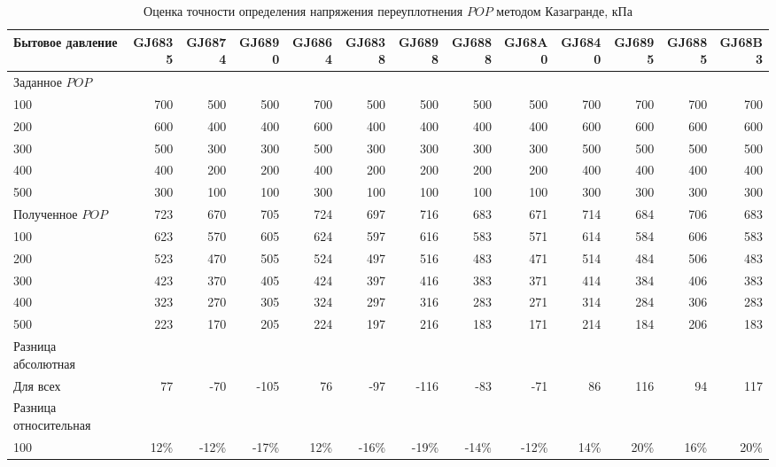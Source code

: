 \begin{sidewaystable}[p]
    \centering
    \small
    \caption{Оценка точности определения напряжения переуплотнения $POP$ методом Казагранде, кПа} \label{tab:pop-caz}
    \begin{tabular}{@{}lrrrrrrrrrrrr@{}}
    \toprule
    Бытовое давление & GJ6835 & GJ6874 & GJ6890 & GJ6864 & GJ6838 & GJ6898 & GJ6888 & GJ68A0 & GJ6840 & GJ6895 & GJ6885 & GJ68B3 \\
    \midrule
    Заданное $POP$ &  &  &  &  &  &  &  &  &  &  &  &  \\
    100 & 700 & 500 & 500 & 700 & 500 & 500 & 500 & 500 & 700 & 700 & 700 & 700 \\
    200 & 600 & 400 & 400 & 600 & 400 & 400 & 400 & 400 & 600 & 600 & 600 & 600 \\
    300 & 500 & 300 & 300 & 500 & 300 & 300 & 300 & 300 & 500 & 500 & 500 & 500 \\
    400 & 400 & 200 & 200 & 400 & 200 & 200 & 200 & 200 & 400 & 400 & 400 & 400 \\
    500 & 300 & 100 & 100 & 300 & 100 & 100 & 100 & 100 & 300 & 300 & 300 & 300 \\
    \midrule
    Полученное $POP$ & 723 & 670 & 705 & 724 & 697 & 716 & 683 & 671 & 714 & 684 & 706 & 683 \\
    100 & 623 & 570 & 605 & 624 & 597 & 616 & 583 & 571 & 614 & 584 & 606 & 583 \\
    200 & 523 & 470 & 505 & 524 & 497 & 516 & 483 & 471 & 514 & 484 & 506 & 483 \\
    300 & 423 & 370 & 405 & 424 & 397 & 416 & 383 & 371 & 414 & 384 & 406 & 383 \\
    400 & 323 & 270 & 305 & 324 & 297 & 316 & 283 & 271 & 314 & 284 & 306 & 283 \\
    500 & 223 & 170 & 205 & 224 & 197 & 216 & 183 & 171 & 214 & 184 & 206 & 183 \\
    \midrule
    Разница абсолютная &  &  &  &  &  &  &  &  &  &  &  &  \\
    Для всех & 77 & -70 & -105 & 76 & -97 & -116 & -83 & -71 & 86 & 116 & 94 & 117 \\
    \midrule
    Разница относительная &  &  &  &  &  &  &  &  &  &  &  &  \\
    100 & 12\% & -12\% & -17\% & 12\% & -16\% & -19\% & -14\% & -12\% & 14\% & 20\% & 16\% & 20\% \\

\end{tabular}
\end{sidewaystable}
